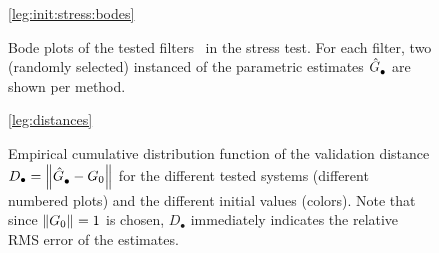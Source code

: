 \begin{figure}[p]
  \setlength{\figurewidth}{0.85\columnwidth}
  \setlength{\figureheight}{0.68\figurewidth}
  \centering
  \ref{leg:init:stress:bodes}
  
  \caption[Bode plots of the stress test filters.]{Bode plots of the tested filters~ in the stress test. 
  For each filter, two (randomly selected) instanced of the parametric estimates $\hat{G}_{\mathrm{\bullet}}^{\mathrm{}}$ are shown per method.
  }
  \label{fig:bodeplots}
\end{figure}

\begin{figure}[p]
  \setlength{\figurewidth}{0.85\columnwidth}
  \setlength{\figureheight}{0.68\figurewidth}
  \centering
  \ref{leg:distances}
  
  \caption[Empirical  of $\validationDistance{\bullet}$ in the stress test.]{Empirical cumulative distribution function of the validation distance $D_{\bullet} = \left\| \hat{G}_{\mathrm{\bullet}}^{\mathrm{}} - G_0 \right\|_{}$ for the different tested systems (different numbered plots) and the different initial values (colors).
  Note that since $\left\| G_0 \right\|_{}=1$ is chosen, $D_{\bullet}$ immediately indicates the relative RMS error of the estimates.
  }
  \label{fig:distancesStress}
\end{figure}

